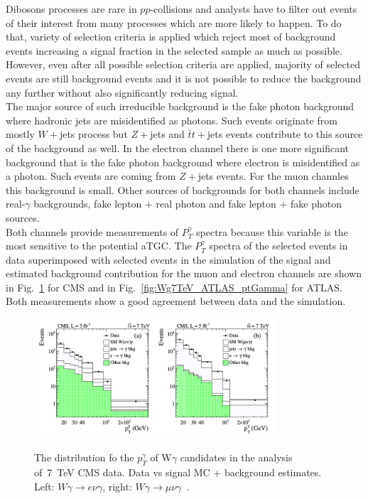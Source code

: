 Dibosons processes are rare in $pp$-collisions and analysts have to filter out events of their interest from many processes which are more likely to happen. To do that, variety of selection criteria is applied which reject most of background events increasing a signal fraction in the selected sample  as much as possible. However, even after all possible selection criteria are applied, majority of selected events are still background events and it is not possible to reduce the background any further without also significantly reducing signal.\\

The major source of such irreducible background is the fake photon background where hadronic jets are misidentified as photons. Such events originate from mostly $W+$jets process but $Z+$jets and $\bar{t}t+$jets events contribute to this source of the background as well. In the electron channel there is one more significant background that is the fake photon background where electron is misidentified as a photon.  Such events are coming from $Z+$jets events. For the muon channles this background is small.  Other sources of backgrounds for both channels include real-$\gamma$ backgrounds, fake lepton + real photon and fake lepton + fake photon sources.\\

Both channels provide measurements of $P_T^\gamma$ spectra because this variable is the most sensitive to the potential aTGC. The $P_T^\gamma$ spectra of the selected events in data superimposed with selected events in the simulation of the signal and estimated background contribution for the muon and electron channels are shown in Fig.~\ref{fig:Wg7TeV_CMS_ptGamma} for CMS and in Fig.~\ref{fig:Wg7TeV_ATLAS_ptGamma} for ATLAS. Both measurements show a good agreement between data and the simulation.\\


\begin{figure}[htb]
  \begin{center}
    {\includegraphics[width=0.80\textwidth]{../figs/WgAbout/Wg7TeV_CMS_ptGamma.png}}
    \caption{The distribution fo the $p_T^\gamma$ of W$\gamma$ candidates in the analysis of~7~TeV CMS data. Data vs signal MC + background estimates. Left: $W\gamma\rightarrow e\nu\gamma$, right: $W\gamma\rightarrow \mu\nu\gamma$~\cite{ref_7TeV_CMS}.}
    \label{fig:Wg7TeV_CMS_ptGamma}
  \end{center}
\end{figure}

